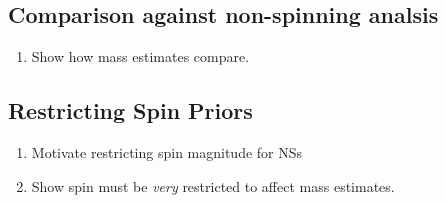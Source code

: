 \subsection{Comparison against non-spinning analsis}

\begin{enumerate}
\item Show how mass estimates compare.
\end{enumerate}


\subsection{Restricting Spin Priors}

\begin{enumerate}
\item Motivate restricting spin magnitude for NSs
\item Show spin must be \textit{very} restricted to affect mass estimates.
\end{enumerate}